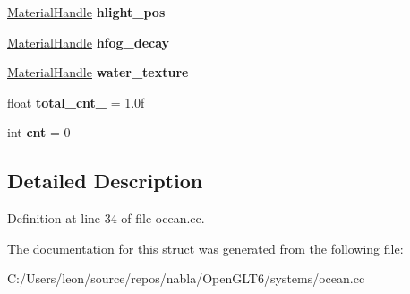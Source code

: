 \begin{DoxyCompactItemize}
\mbox{\hyperlink{classnabla_1_1renderer_1_1_handle}{Material\+Handle}} {\bfseries hlight\+\_\+pos}
\item 
\mbox{\label{structnabla_1_1_ocean_system_1_1_data_a55aa9a5a860a511699941acd5290cfd0}} 
\mbox{\hyperlink{classnabla_1_1renderer_1_1_handle}{Material\+Handle}} {\bfseries hfog\+\_\+decay}
\item 
\mbox{\label{structnabla_1_1_ocean_system_1_1_data_aed0abd85196017a6c69795238f83b77e}} 
\mbox{\hyperlink{classnabla_1_1renderer_1_1_handle}{Material\+Handle}} {\bfseries water\+\_\+texture}
\item 
\mbox{\label{structnabla_1_1_ocean_system_1_1_data_a8877c5fde4a8cc200b323b4d1140a442}} 
float {\bfseries total\+\_\+cnt\+\_\+} = 1.\+0f
\item 
\mbox{\label{structnabla_1_1_ocean_system_1_1_data_ac961fa82af57068ee8463338892c229b}} 
int {\bfseries cnt} = 0
\end{DoxyCompactItemize}


\subsection{Detailed Description}


Definition at line 34 of file ocean.\+cc.



The documentation for this struct was generated from the following file\+:\begin{DoxyCompactItemize}
\item 
C\+:/\+Users/leon/source/repos/nabla/\+Open\+G\+L\+T6/systems/ocean.\+cc\end{DoxyCompactItemize}
